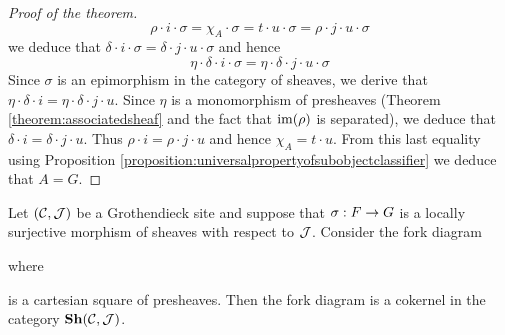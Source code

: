 \begin{proof}[Proof of the theorem]
$$\rho\cdot i\cdot \sigma = \chi_A\cdot \sigma = t\cdot u\cdot \sigma = \rho\cdot j\cdot u\cdot \sigma$$
we deduce that $\delta \cdot i\cdot \sigma = \delta\cdot j\cdot u\cdot \sigma$ and hence
$$\eta\cdot \delta\cdot i \cdot \sigma = \eta\cdot \delta\cdot j\cdot u\cdot \sigma$$
Since $\sigma$ is an epimorphism in the category of sheaves, we derive that $\eta\cdot \delta \cdot i = \eta\cdot \delta\cdot j\cdot u$. Since $\eta$ is a monomorphism of presheaves (Theorem \ref{theorem:associatedsheaf} and the fact that $\mathrm{im}(\rho)$ is separated), we deduce that $\delta\cdot i = \delta \cdot j\cdot u$. Thus $\rho \cdot i = \rho\cdot j\cdot u$ and hence $\chi_A = t\cdot u$. From this last equality using Proposition \ref{proposition:universalpropertyofsubobjectclassifier} we deduce that $A = G$.
\end{proof}

\begin{theorem}
Let $({\mathcal C},{\mathcal J})$ be a Grothendieck site and suppose that $\sigma:F\rightarrow G$ is a locally surjective morphism of sheaves with respect to ${\mathcal J}$. Consider the fork diagram
\begin{center}
\end{center}
where
\begin{center}
\end{center}
is a cartesian square of presheaves. Then the fork diagram is a cokernel in the category $\mathbf{Sh}({\mathcal C},{\mathcal J})$.
\end{theorem}

